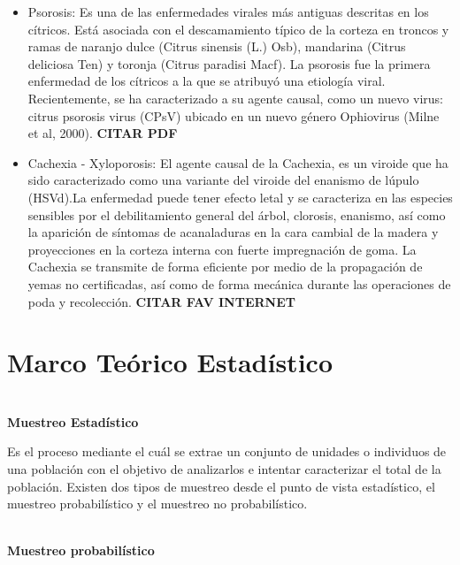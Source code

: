 \begin{itemize}
\item Psorosis: Es una de las enfermedades virales m\'{a}s antiguas descritas en los c\'{i}tricos. Est\'{a} asociada con el descamamiento t\'{i}pico de la corteza en troncos y ramas de naranjo dulce (Citrus sinensis (L.) Osb), mandarina (Citrus deliciosa Ten) y toronja (Citrus paradisi Macf). La psorosis fue la primera enfermedad de los c\'{i}tricos a la que se atribuy\'{o} una etiolog\'{i}a viral. Recientemente, se ha caracterizado a su agente causal, como un nuevo virus: citrus psorosis virus (CPsV) ubicado en un nuevo g\'{e}nero Ophiovirus (Milne et al, 2000). \textbf{CITAR PDF}
\item Cachexia - Xyloporosis: El agente causal de la Cachexia, es un viroide que ha sido caracterizado como una variante del viroide del enanismo de l\'{u}pulo (HSVd).La enfermedad puede tener efecto letal y se caracteriza en las especies sensibles por el debilitamiento general del \'{a}rbol, clorosis, enanismo, as\'{i} como la aparici\'{o}n de s\'{i}ntomas de acanaladuras en la cara cambial de la madera y proyecciones en la corteza interna con fuerte impregnaci\'{o}n de goma. La Cachexia se transmite de forma eficiente por medio de la propagaci\'{o}n de yemas no certificadas, as\'{i} como de forma mec\'{a}nica durante las operaciones de poda y recolecci\'{o}n. \textbf{CITAR FAV INTERNET}
\end{itemize}

\section{Marco Te\'{o}rico Estad\'{i}stico}
~\\\textbf{Muestreo Estad\'{i}stico}

Es el proceso mediante el cu\'{a}l se extrae un conjunto de unidades o individuos de una poblaci\'{o}n con el objetivo de analizarlos e intentar caracterizar el total de la poblaci\'{o}n. Existen dos tipos de muestreo desde el punto de vista estad\'{i}stico, el muestreo probabil\'{i}stico y el muestreo no probabil\'{i}stico.

~\\\textbf{Muestreo probabil\'{i}stico} 

